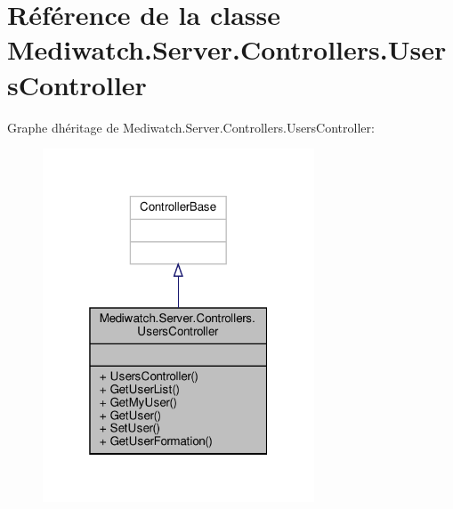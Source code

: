\hypertarget{class_mediwatch_1_1_server_1_1_controllers_1_1_users_controller}{}\section{Référence de la classe Mediwatch.\+Server.\+Controllers.\+Users\+Controller}
\label{class_mediwatch_1_1_server_1_1_controllers_1_1_users_controller}


Graphe d\textquotesingle{}héritage de Mediwatch.\+Server.\+Controllers.\+Users\+Controller\+:\nopagebreak
\begin{figure}[H]
\begin{center}
\leavevmode
\includegraphics[width=229pt]{class_mediwatch_1_1_server_1_1_controllers_1_1_users_controller__inherit__graph}
\end{center}
\end{figure}


